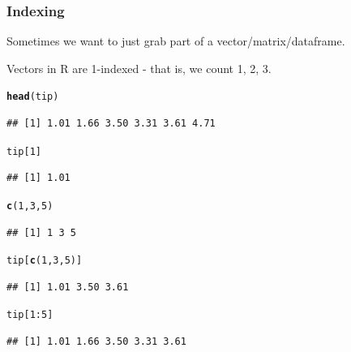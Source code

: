 \documentclass{beamer}\usepackage[]{graphicx}\usepackage[]{color}
\makeatletter
\newcommand{\hlnum}[1]{\textcolor[rgb]{0.686,0.059,0.569}{#1}}%
\newcommand{\hlopt}[1]{\textcolor[rgb]{0,0,0}{#1}}%
\newcommand{\hlstd}[1]{\textcolor[rgb]{0.345,0.345,0.345}{#1}}%
\newcommand{\hlkwd}[1]{\textcolor[rgb]{0.737,0.353,0.396}{\textbf{#1}}}%
\newenvironment{kframe}{%
 \def\at@end@of@kframe{}%
 \ifinner\ifhmode%
  \def\at@end@of@kframe{\end{minipage}}%
  \begin{minipage}{\columnwidth}%
 \fi\fi%
 \def\FrameCommand##1{\hskip\@totalleftmargin \hskip-\fboxsep
 \colorbox{shadecolor}{##1}\hskip-\fboxsep
     \hskip-\linewidth \hskip-\@totalleftmargin \hskip\columnwidth}%
 \MakeFramed {\advance\hsize-\width
   \@totalleftmargin\z@ \linewidth\hsize
   \@setminipage}}%
 {\par\unskip\endMakeFramed%
 \at@end@of@kframe}
\newenvironment{knitrout}{}{} %
\makeatother
\begin{document}
\begin{frame}[fragile]
    \frametitle{Indexing}
Sometimes we want to just grab part of a vector/matrix/dataframe.  

Vectors in R are 1-indexed - that is, we count 1, 2, 3.
\begin{knitrout}\footnotesize
{}\color{fgcolor}\begin{kframe}
\begin{alltt}
\hlkwd{head}\hlstd{(tip)}
\end{alltt}
\begin{verbatim}
## [1] 1.01 1.66 3.50 3.31 3.61 4.71
\end{verbatim}
\begin{alltt}
\hlstd{tip[}\hlnum{1}\hlstd{]}
\end{alltt}
\begin{verbatim}
## [1] 1.01
\end{verbatim}
\begin{alltt}
\hlkwd{c}\hlstd{(}\hlnum{1}\hlstd{,} \hlnum{3}\hlstd{,} \hlnum{5}\hlstd{)}
\end{alltt}
\begin{verbatim}
## [1] 1 3 5
\end{verbatim}
\begin{alltt}
\hlstd{tip[}\hlkwd{c}\hlstd{(}\hlnum{1}\hlstd{,} \hlnum{3}\hlstd{,} \hlnum{5}\hlstd{)]}
\end{alltt}
\begin{verbatim}
## [1] 1.01 3.50 3.61
\end{verbatim}
\begin{alltt}
\hlstd{tip[}\hlnum{1}\hlopt{:}\hlnum{5}\hlstd{]}
\end{alltt}
\begin{verbatim}
## [1] 1.01 1.66 3.50 3.31 3.61
\end{verbatim}
\end{kframe}
\end{knitrout}

\end{frame}
\end{document}
